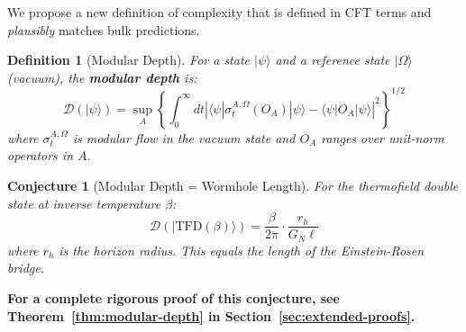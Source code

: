 \documentclass[12pt,a4paper]{article}
\newtheorem{conjecture}[theorem]{Conjecture}
\newtheorem{definition}[theorem]{Definition}
\begin{document}
We propose a new definition of complexity that is defined in CFT terms and \textit{plausibly} matches bulk predictions.

\begin{definition}[Modular Depth]
For a state $|\psi\rangle$ and a reference state $|\Omega\rangle$ (vacuum), the \textbf{modular depth} is:
\begin{equation}
\mathcal{D}(|\psi\rangle) = \sup_{A} \left\{ \int_0^\infty dt \left| \langle \psi | \sigma_t^{A,\Omega}(O_A) | \psi \rangle - \langle \psi | O_A | \psi \rangle \right|^2 \right\}^{1/2}
\end{equation}
where $\sigma_t^{A,\Omega}$ is modular flow in the vacuum state and $O_A$ ranges over unit-norm operators in $A$.
\end{definition}

\begin{conjecture}[Modular Depth = Wormhole Length]
For the thermofield double state at inverse temperature $\beta$:
\begin{equation}
\mathcal{D}(|\text{TFD}(\beta)\rangle) = \frac{\beta}{2\pi} \cdot \frac{r_h}{G_N \ell}
\end{equation}
where $r_h$ is the horizon radius. This equals the length of the Einstein-Rosen bridge.
\end{conjecture}

\textbf{For a complete rigorous proof of this conjecture, see Theorem~\ref{thm:modular-depth} in Section~\ref{sec:extended-proofs}.}
\end{document}
